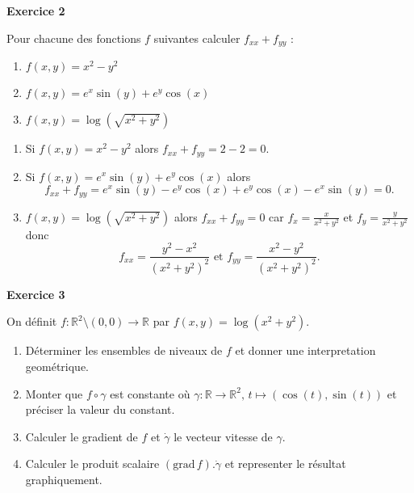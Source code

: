 \documentclass[a4paper,12pt]{article}
\begin{document}
\hrulefill

\vspace{1cm}

\begin{center}
{\large{\bf Exercice 2}}
\end{center}

Pour chacune des fonctions $f$ suivantes calculer $f_{xx} + f_{yy}$
: 

\begin{enumerate}
	\item $f(x,y)=  x^2 - y^2$
	\item $f(x,y) = e^x \sin(y) + e^y \cos(x)$
	\item $f(x,y)=  \log(\sqrt{ x^2 + y^2})$
	
\end{enumerate}

\hrulefill

\begin{enumerate}
	\item
Si $f(x,y) =  x^2 - y^2$ alors $f_{xx} + f_{yy} = 2 - 2 = 0$.
	\item
Si $f(x,y) = e^x \sin(y) + e^y \cos(x)$ alors 
$$f_{xx} + f_{yy} = e^x
\sin(y) - e^y \cos(x) + e^y \cos(x) - e^x \sin(y) = 0.$$
\item $f(x,y)=  \log(\sqrt{ x^2 + y^2})$ alors $f_{xx} + f_{yy} = 0$
car $f_x = \frac{x}{x^2 + y^2}$ et $f_y = \frac{y}{x^2 + y^2}$
donc $$f_{xx} = \frac{y^2 - x^2}{(x^2 + y^2)^2} 
\text{ et }f_{yy} = \frac{x^2 - y^2}{(x^2 + y^2)^2}.$$
\end{enumerate}


\vspace{1cm}

\begin{center}
{\large{\bf Exercice 3}}
\end{center}


On définit $f:\mathbb{R}^2 \setminus (0,0)\rightarrow	\mathbb{R}$ par $f(x,y) = \log(x^2 +
y^2)$.

\begin{enumerate}
	\item Déterminer les ensembles de niveaux de $f$ et
		donner une interpretation geométrique.
	\item Monter que $f\circ \gamma$ est constante o\`u
		$\gamma: \mathbb{R} \rightarrow
		\mathbb{R}^2
		,\, t \mapsto (\cos(t),\sin(t))$ et préciser
		la valeur du constant.

	\item  Calculer le gradient de $f$ et $\dot{\gamma}$ le vecteur
		vitesse de $\gamma$. 
	\item Calculer le produit scalaire 
		$(\mathrm{grad}\,f).\dot{\gamma}$ et representer le résultat
		graphiquement.
	
\end{enumerate}
 
\end{document}
